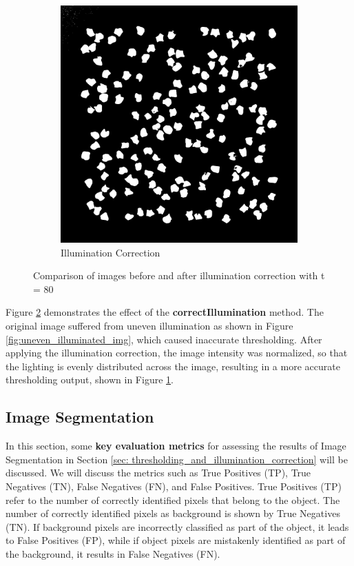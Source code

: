 \documentclass[%
	a4paper, %
	12pt, %
	english, %
	bibtotoc %
]{scrartcl}
\begin{document}
\begin{figure}[H]
\begin{subfigure}[b]{0.3\textwidth}
        \centering
        \includegraphics[width=\textwidth]{Illuminated_Thresholded Image.jpg}
        \caption{Illumination Correction}
        \label{fig:illuminated_correction_img}
    \end{subfigure}
    \caption{Comparison of images before and after illumination correction with t = 80}
    \label{fig:comparison_after_illumination}
\end{figure}

Figure \ref{fig:comparison_after_illumination} demonstrates the effect of the \textbf{correctIllumination} method. The original image suffered from uneven illumination as shown in Figure \ref{fig:uneven_illuminated_img}, which caused inaccurate thresholding. After applying the illumination correction, the image intensity was normalized, so that the lighting is evenly distributed across the image, resulting in a more accurate thresholding output, shown in Figure \ref{fig:illuminated_correction_img}.

\subsection{Image Segmentation}
\label{sec:image_segmentation}
In this section, some \textbf{key evaluation metrics} for assessing the results of Image Segmentation in Section \ref{sec: thresholding_and_illumination_correction} will be discussed. We will discuss the metrics such as  True Positives (TP), True Negatives (TN), False Negatives (FN), and False Positives. True Positives (TP) refer to the number of correctly identified pixels that belong to the object. The number of correctly identified pixels as background is shown by True Negatives (TN). If background pixels are incorrectly classified as part of the object, it leads to False Positives (FP), while if object pixels are mistakenly identified as part of the background, it results in False Negatives (FN).
\end{document}
